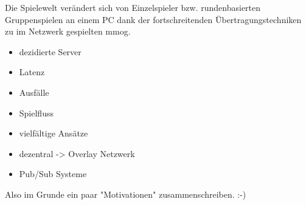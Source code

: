 Die Spielewelt verändert sich von Einzelspieler bzw. rundenbasierten Gruppenspielen an einem PC dank der fortschreitenden Übertragungstechniken zu im Netzwerk gespielten \ac{mmog}.

\begin{itemize}
\item dezidierte Server
\item Latenz
\item Ausfälle
\item Spielfluss
\end{itemize}

\begin{itemize}
\item vielfältige Ansätze \cite{citeulike:3718632, citeulike:4243573} %
\item dezentral -> Overlay Netzwerk
\item Pub/Sub Systeme \cite{citeulike:1401901} %
\end{itemize}

Also im Grunde ein paar "Motivationen" zusammenschreiben. :-)
